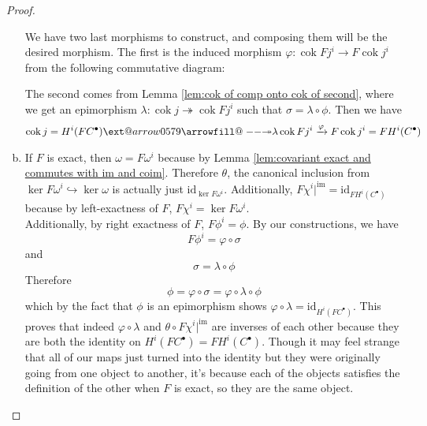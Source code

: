 \documentclass{article}
\makeatletter
\newcommand{\id}{\mathrm{id}}
\DeclareMathOperator{\im}{\mathrm{im}}
\DeclareMathOperator{\cok}{\mathrm{cok}}
\newcommand\xtwoheadrightarrow[2][]{%
  \ext@arrow 0579{\twoheadrightarrowfill@}{#1}{#2}}
\newcommand\twoheadrightarrowfill@{%
  \arrowfill@\relbar\relbar\twoheadrightarrow}
\makeatother
\begin{document}
\begin{proof}
\begin{enumerate}[(a)]
\begin{center}
    \end{center}
    We have two last morphisms to construct, and composing them will be the desired morphism. The first is the induced morphism $\varphi:\cok Fj^i\to F\cok j^i$ from the following commutative diagram:
        \begin{center}
    \end{center}
    The second comes from Lemma \ref{lem:cok of comp onto cok of second}, where we get an epimorphism $\lambda:\cok j \twoheadrightarrow \cok Fj^i$ such that $\sigma=\lambda \circ \phi$. Then we have
    \begin{align*}
        \cok j=H^i(FC^\bullet)\xtwoheadrightarrow{\lambda} \cok Fj^i \xrightarrow{\varphi} F\cok j^i=FH^i(C^\bullet)
    \end{align*}
    \item 
    If $F$ is exact, then $\omega=F\omega^i$ because by Lemma \ref{lem:covariant exact and commutes with im and coim}. Therefore $\theta$, the canonical inclusion from $\ker F\omega^i\hookrightarrow \ker \omega$ is actually just $\id_{\ker F\omega^i}$. Additionally, $F\chi^i\vert^{\im} =\id_{FH^i(C^\bullet)}$ because by left-exactness of $F$, $F\chi^i=\ker F\omega^i$.\\
    Additionally, by right exactness of $F$, $F\phi^i=\phi$. By our constructions, we have
    \[
    F\phi^i=\varphi\circ \sigma
    \]
    and
    \[
    \sigma=\lambda \circ \phi
    \]
    Therefore
    \[
    \phi=\varphi \circ \sigma=\varphi\circ \lambda \circ \phi
    \]
    which by the fact that $\phi$ is an epimorphism shows $\varphi \circ \lambda=\id_{H^i(FC^\bullet)}$. This proves that indeed $\varphi \circ \lambda$ and $\theta \circ F\chi^i\vert^{\im}$ are inverses of each other because they are both the identity on $H^i(FC^\bullet)=FH^i(C^\bullet)$. Though it may feel strange that all of our maps just turned into the identity but they were originally going from one object to another, it's because each of the objects satisfies the definition of the other when $F$ is exact, so they are the same object.
    \end{enumerate}
\end{proof}
\end{document}
